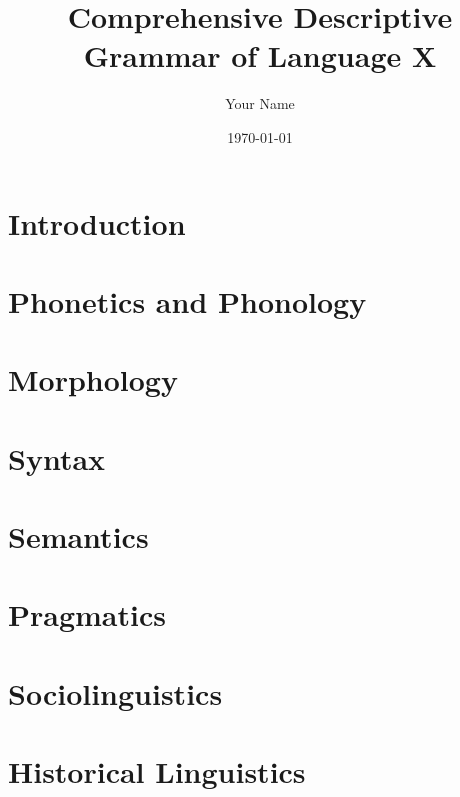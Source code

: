 \documentclass[a4paper,11pt]{book}
\begin{document}
\title{Comprehensive Descriptive Grammar of Language X}
\author{Your Name}
\date{\today}

\maketitle

\tableofcontents

\chapter{Introduction}
%

\chapter{Phonetics and Phonology}
%

\chapter{Morphology}
%

\chapter{Syntax}
%

\chapter{Semantics}
%

\chapter{Pragmatics}
%

\chapter{Sociolinguistics}
%

\chapter{Historical Linguistics}
%



\end{document}
